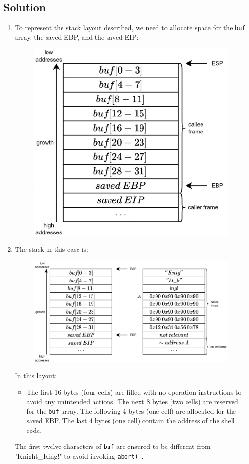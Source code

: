 \subsection*{Solution}
\begin{enumerate}
    \item To represent the stack layout described, we need to allocate space for the \texttt{buf} array, the saved EBP, and the saved EIP:
        \begin{figure}[H]
            \centering
            \includegraphics[width=0.5\linewidth]{images/stack.png}
        \end{figure}
    \item The stack in this case is: 
        \begin{figure}[H]
            \centering
            \includegraphics[width=0.75\linewidth]{images/stack1.png}
        \end{figure}
        In this layout:
        \begin{itemize}
            \item The first 16 bytes (four cells) are filled with no-operation instructions to avoid any unintended actions.
            The next 8 bytes (two cells) are reserved for the \texttt{buf} array.
            The following 4 bytes (one cell) are allocated for the saved EBP.
            The last 4 bytes (one cell) contain the address of the shell code.
        \end{itemize}
        The first twelve characters of \texttt{buf} are ensured to be different from "Knight\_King!" to avoid invoking \texttt{abort()}.
\end{enumerate}